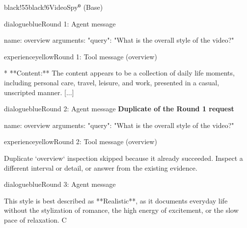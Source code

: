 \begin{ExecutionBox}{black!55}{black!6}{VideoSpy$^{\mathbf{0}}$ (Base)}
\raggedright
\begin{MessageBox}{dialogueblue}{Round 1: Agent message}
\begin{Trajectory}
name: overview  arguments: {"query": "What is the overall style of the video?"}
\end{Trajectory}
\end{MessageBox}
\begin{MessageBox}{experienceyellow}{Round 1: Tool message (overview)}
\begin{Trajectory}
[...] *   **Content:** The content appears to be a collection of daily life moments, including personal care, travel, leisure, and work, presented in a casual, unscripted manner. [...]
\end{Trajectory}
\end{MessageBox}
\begin{MessageBox}[agent message,frame hidden,borderline={1pt}{0pt}{changeaccent,dash pattern=on 3pt off 2pt},colbacktitle=red!4]{dialogueblue}{Round 2: Agent message}
\noindent\textcolor{changeaccent}{\textbf{Duplicate of the Round 1 request}}\par
\begin{Trajectory}
name: overview  arguments: {"query": "What is the overall style of the video?"}
\end{Trajectory}
\end{MessageBox}
\begin{MessageBox}{experienceyellow}{Round 2: Tool message (overview)}
\begin{Trajectory}
Duplicate `overview` inspection skipped because it already succeeded. Inspect a different interval or detail, or answer from the existing evidence.
\end{Trajectory}
\end{MessageBox}
\begin{MessageBox}{dialogueblue}{Round 3: Agent message}
\begin{Trajectory}
[...] This style is best described as **Realistic**, as it documents everyday life without the stylization of romance, the high energy of excitement, or the slow pace of relaxation.
C
\end{Trajectory}
\end{MessageBox}
\end{ExecutionBox}

